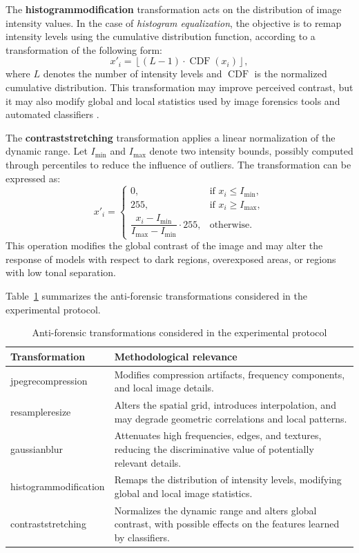 The \textbf{\gls{histogrammodification}} transformation acts on the distribution
of image intensity values. In the case of \textit{histogram equalization}, the
objective is to remap intensity levels using the cumulative distribution
function, according to a transformation of the following form:
\[
x'_i = \left\lfloor (L-1)\cdot \operatorname{CDF}(x_i) \right\rfloor,
\]
where \(L\) denotes the number of intensity levels and \(\operatorname{CDF}\) is
the normalized cumulative distribution. This transformation may improve
perceived contrast, but it may also modify global and local statistics used by
image forensics tools and automated classifiers \cite{barni2018cf}.

The \textbf{\gls{contraststretching}} transformation applies a linear
normalization of the dynamic range. Let \(I_{\min}\) and \(I_{\max}\) denote two
intensity bounds, possibly computed through percentiles to reduce the influence
of outliers. The transformation can be expressed as:
\[
x'_i =
\begin{cases}
0, & \text{if } x_i \leq I_{\min}, \\
255, & \text{if } x_i \geq I_{\max}, \\
\dfrac{x_i - I_{\min}}{I_{\max} - I_{\min}} \cdot 255, & \text{otherwise}.
\end{cases}
\]
This operation modifies the global contrast of the image and may alter the
response of models with respect to dark regions, overexposed areas, or regions
with low tonal separation.

Table~\ref{tab:background_antiforensic_transformations} summarizes the
anti-forensic transformations considered in the experimental protocol.

\begin{table}[htbp]
    \centering
    \small
    \renewcommand{\arraystretch}{1.25}
    \begin{tabularx}{\textwidth}{@{}lX@{}}
        \toprule
        \textbf{Transformation} & \textbf{Methodological relevance} \\
        \midrule
        \gls{jpegrecompression} &
        Modifies compression artifacts, frequency components, and local image
        details. \\
        \gls{resampleresize} &
        Alters the spatial grid, introduces interpolation, and may degrade
        geometric correlations and local patterns. \\
        \gls{gaussianblur} &
        Attenuates high frequencies, edges, and textures, reducing the
        discriminative value of potentially relevant details. \\
        \gls{histogrammodification} &
        Remaps the distribution of intensity levels, modifying global and local
        image statistics. \\
        \gls{contraststretching} &
        Normalizes the dynamic range and alters global contrast, with possible
        effects on the features learned by classifiers. \\
        \bottomrule
    \end{tabularx}
    \caption{Anti-forensic transformations considered in the experimental protocol}
    \label{tab:background_antiforensic_transformations}
\end{table}

